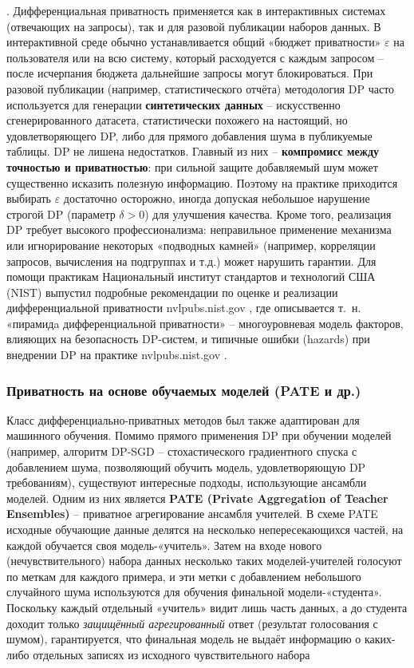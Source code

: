 . Дифференциальная приватность применяется как в интерактивных системах (отвечающих на запросы), так и для разовой публикации наборов данных. В интерактивной среде обычно устанавливается общий «бюджет приватности» $\varepsilon$ на пользователя или на всю систему, который расходуется с каждым запросом – после исчерпания бюджета дальнейшие запросы могут блокироваться. При разовой публикации (например, статистического отчёта) методология DP часто используется для генерации \textbf{синтетических данных} – искусственно сгенерированного датасета, статистически похожего на настоящий, но удовлетворяющего DP, либо для прямого добавления шума в публикуемые таблицы. DP не лишена недостатков. Главный из них – \textbf{компромисс между точностью и приватностью}: при сильной защите добавляемый шум может существенно исказить полезную информацию. Поэтому на практике приходится выбирать $\varepsilon$ достаточно осторожно, иногда допуская небольшое нарушение строгой DP (параметр $\delta>0$) для улучшения качества. Кроме того, реализация DP требует высокого профессионализма: неправильное применение механизма или игнорирование некоторых «подводных камней» (например, корреляции запросов, вычисления на подгруппах и т.д.) может нарушить гарантии. Для помощи практикам Национальный институт стандартов и технологий США (NIST) выпустил подробные рекомендации по оценке и реализации дифференциальной приватности
nvlpubs.nist.gov
, где описывается т. н. «пирамидa дифференциальной приватности» – многоуровневая модель факторов, влияющих на безопасность DP-систем, и типичные ошибки (hazards) при внедрении DP на практике
nvlpubs.nist.gov
. \subsubsection{Приватность на основе обучаемых моделей (PATE и др.)}
Класс дифференциально-приватных методов был также адаптирован для машинного обучения. Помимо прямого применения DP при обучении моделей (например, алгоритм DP-SGD – стохастического градиентного спуска с добавлением шума, позволяющий обучить модель, удовлетворяющую DP требованиям), существуют интересные подходы, использующие ансамбли моделей. Одним из них является \textbf{PATE (Private Aggregation of Teacher Ensembles)} – приватное агрегирование ансамбля учителей. В схеме PATE исходные обучающие данные делятся на несколько непересекающихся частей, на каждой обучается своя модель-«учитель». Затем на входе нового (нечувствительного) набора данных несколько таких моделей-учителей голосуют по меткам для каждого примера, и эти метки с добавлением небольшого случайного шума используются для обучения финальной модели-«студента». Поскольку каждый отдельный «учитель» видит лишь часть данных, а до студента доходит только \textit{защищённый агрегированный} ответ (результат голосования с шумом), гарантируется, что финальная модель не выдаёт информацию о каких-либо отдельных записях из исходного чувствительного набора
